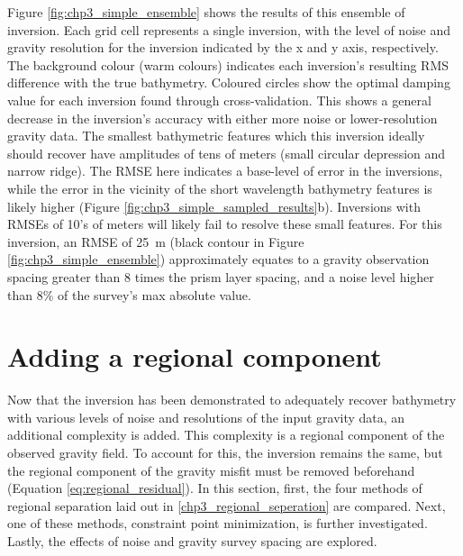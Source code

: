 Figure \ref{fig:chp3_simple_ensemble} shows the results of this ensemble of inversion. Each grid cell represents a single inversion, with the level of noise and gravity resolution for the inversion indicated by the x and y axis, respectively. The background colour (warm colours) indicates each inversion's resulting RMS difference with the true bathymetry. Coloured circles show the optimal damping value for each inversion found through cross-validation. This shows a general decrease in the inversion's accuracy with either more noise or lower-resolution gravity data. The smallest bathymetric features which this inversion ideally should recover have amplitudes of tens of meters (small circular depression and narrow ridge). The RMSE here indicates a base-level of error in the inversions, while the error in the vicinity of the short wavelength bathymetry features is likely higher (Figure \ref{fig:chp3_simple_sampled_results}b). Inversions with RMSEs of 10's of meters will likely fail to resolve these small features. For this inversion, an RMSE of 25~m (black contour in Figure \ref{fig:chp3_simple_ensemble}) approximately equates to a gravity observation spacing greater than 8 times the prism layer spacing, and a noise level higher than 8\% of the survey's max absolute value.

\section{Adding a regional component} \label{chp3:simple_regional_model}

Now that the inversion has been demonstrated to adequately recover bathymetry with various levels of noise and resolutions of the input gravity data, an additional complexity is added. This complexity is a regional component of the observed gravity field. To account for this, the inversion remains the same, but the regional component of the gravity misfit must be removed beforehand (Equation \ref{eq:regional_residual}). In this section, first, the four methods of regional separation laid out in \ref{chp3_regional_seperation} are compared. Next, one of these methods, constraint point minimization, is further investigated. Lastly, the effects of noise and gravity survey spacing are explored. 

